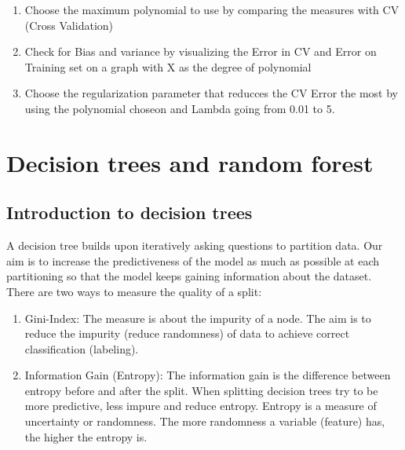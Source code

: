 \documentclass{article}
\begin{document}
\begin{enumerate}  
\item Choose the maximum polynomial to use by comparing the measures with CV (Cross Validation)

\item Check for Bias and variance by visualizing the Error in CV and Error on Training set on a graph with X as the degree of polynomial
\item Choose the regularization parameter that reducces the CV Error the most by using the polynomial choseon and Lambda going from 0.01 to 5.
\end{enumerate}


\section{Decision trees and random forest}
\subsection{Introduction to decision trees}
A decision tree builds upon iteratively asking questions to partition data.
Our aim is to increase the predictiveness of the model as much as possible at each partitioning so that the model keeps gaining information about the dataset.
There are two ways to measure the quality of a split:
\begin{enumerate}
	\item Gini-Index: The measure is about the impurity of a node. The aim is to reduce the impurity (reduce randomness) of data to achieve correct classification (labeling).
	\item Information Gain (Entropy):
	The information gain is the difference between entropy before and after the split.
	When splitting decision trees try to be more predictive, less impure and reduce entropy. Entropy is a measure of uncertainty or randomness. The more randomness a variable (feature) has, the higher the entropy is.  
\end{enumerate}
\end{document}
